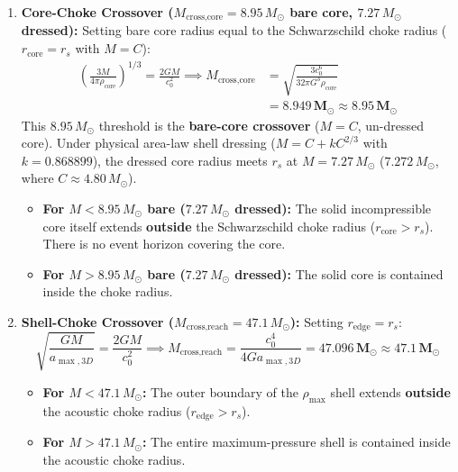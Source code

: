 \documentclass[11pt,a4paper]{article}
\begin{document}
\begin{enumerate}
    \item \textbf{Core-Choke Crossover ($M_{\text{cross,core}} = 8.95\,M_\odot$ bare core, $7.27\,M_\odot$ dressed):}  
    Setting bare core radius equal to the Schwarzschild choke radius ($r_{\text{core}} = r_s$ with $M = C$):
    \begin{equation}
    \begin{aligned} \left(\frac{3 M}{4\pi \rho_{\text{core}}}\right)^{1/3} = \frac{2GM}{c_0^2} \implies M_{\text{cross,core}} &= \sqrt{\frac{3 c_0^6}{32\pi G^3 \rho_{\text{core}}}} \\ &= \mathbf{8.949\,M_\odot} \approx \mathbf{8.95\,M_\odot} \end{aligned}
    \label{eq:m_cross_core_val}
    \end{equation}
    This $8.95\,M_\odot$ threshold is the \textbf{bare-core crossover} ($M = C$, un-dressed core). Under physical area-law shell dressing ($M = C + k C^{2/3}$ with $k = 0.868899$), the dressed core radius meets $r_s$ at $M = 7.27\,M_\odot$ ($7.272\,M_\odot$, where $C \approx 4.80\,M_\odot$).
    \begin{itemize}
        \item \textbf{For $M < 8.95\,M_\odot$ bare ($7.27\,M_\odot$ dressed):} The solid incompressible core itself extends \textbf{outside} the Schwarzschild choke radius ($r_{\text{core}} > r_s$). There is no event horizon covering the core.
        \item \textbf{For $M > 8.95\,M_\odot$ bare ($7.27\,M_\odot$ dressed):} The solid core is contained inside the choke radius.
    \end{itemize}

    \item \textbf{Shell-Choke Crossover ($M_{\text{cross,reach}} = 47.1\,M_\odot$):}  
    Setting $r_{\text{edge}} = r_s$:
    \begin{equation}
    \sqrt{\frac{GM}{a_{\max,3D}}} = \frac{2GM}{c_0^2} \implies M_{\text{cross,reach}} = \frac{c_0^4}{4 G a_{\max,3D}} = \mathbf{47.096\,M_\odot} \approx \mathbf{47.1\,M_\odot}
    \label{eq:m_cross_reach_val}
    \end{equation}
    \begin{itemize}
        \item \textbf{For $M < 47.1\,M_\odot$:} The outer boundary of the $\rho_{\max}$ shell extends \textbf{outside} the acoustic choke radius ($r_{\text{edge}} > r_s$).
        \item \textbf{For $M > 47.1\,M_\odot$:} The entire maximum-pressure shell is contained inside the acoustic choke radius.
    \end{itemize}
\end{enumerate}
\end{document}
